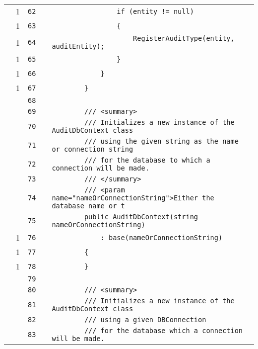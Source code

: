 \documentclass[a4paper,10pt]{article}
\begin{document}
\begin{longtable}[l]{lrrll}
\cellcolor{green} & 1 & \verb~62~ & & \verb~                if (entity != null)~\\
\cellcolor{green} & 1 & \verb~63~ & & \verb~                {~\\
\cellcolor{green} & 1 & \verb~64~ & & \verb~                    RegisterAuditType(entity, auditEntity);~\\
\cellcolor{green} & 1 & \verb~65~ & & \verb~                }~\\
\cellcolor{green} & 1 & \verb~66~ & & \verb~            }~\\
\cellcolor{green} & 1 & \verb~67~ & & \verb~        }~\\
\cellcolor{gray} &  & \verb~68~ & & \verb~~\\
\cellcolor{gray} &  & \verb~69~ & & \verb~        /// <summary>~\\
\cellcolor{gray} &  & \verb~70~ & & \verb~        /// Initializes a new instance of the AuditDbContext class~\\
\cellcolor{gray} &  & \verb~71~ & & \verb~        /// using the given string as the name or connection string~\\
\cellcolor{gray} &  & \verb~72~ & & \verb~        /// for the database to which a connection will be made.~\\
\cellcolor{gray} &  & \verb~73~ & & \verb~        /// </summary>~\\
\cellcolor{gray} &  & \verb~74~ & & \verb~        /// <param name="nameOrConnectionString">Either the database name or t~\\
\cellcolor{gray} &  & \verb~75~ & & \verb~        public AuditDbContext(string nameOrConnectionString)~\\
\cellcolor{green} & 1 & \verb~76~ & & \verb~            : base(nameOrConnectionString)~\\
\cellcolor{green} & 1 & \verb~77~ & & \verb~        {~\\
\cellcolor{green} & 1 & \verb~78~ & & \verb~        }~\\
\cellcolor{gray} &  & \verb~79~ & & \verb~~\\
\cellcolor{gray} &  & \verb~80~ & & \verb~        /// <summary>~\\
\cellcolor{gray} &  & \verb~81~ & & \verb~        /// Initializes a new instance of the AuditDbContext class~\\
\cellcolor{gray} &  & \verb~82~ & & \verb~        /// using a given DBConnection~\\
\cellcolor{gray} &  & \verb~83~ & & \verb~        /// for the database which a connection will be made.~\\

\end{longtable}
\end{document}
